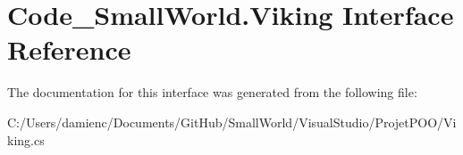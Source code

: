 \hypertarget{interface_code___small_world_1_1_viking}{\section{Code\-\_\-\-Small\-World.\-Viking Interface Reference}
\label{interface_code___small_world_1_1_viking}
}


The documentation for this interface was generated from the following file\-:\begin{DoxyCompactItemize}
\item 
C\-:/\-Users/damienc/\-Documents/\-Git\-Hub/\-Small\-World/\-Visual\-Studio/\-Projet\-P\-O\-O/Viking.\-cs\end{DoxyCompactItemize}

